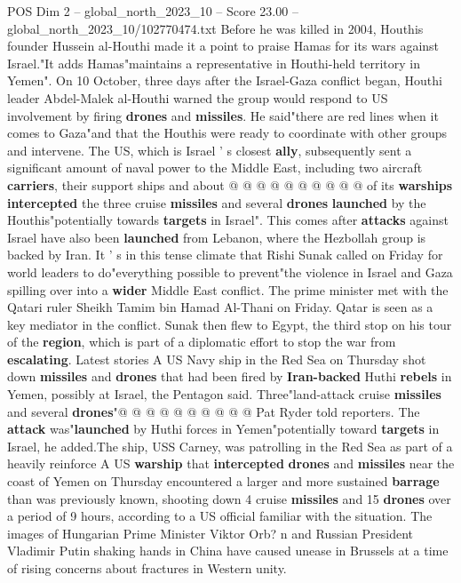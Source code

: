 \begin{textsample}{POS Dim 2 – global\_north\_2023\_10 – Score 23.00 – global\_north\_2023\_10/102770474.txt}
Before he was killed in 2004, Houthis founder Hussein al-Houthi made it a point to praise Hamas for its wars against Israel."It adds Hamas"maintains a representative in Houthi-held territory in Yemen".
On 10 October, three days after the Israel-Gaza conflict began, Houthi leader Abdel-Malek al-Houthi warned the group would respond to US involvement by firing \textbf{drones} and \textbf{missiles}.
He said"there are red lines when it comes to Gaza"and that the Houthis were ready to coordinate with other groups and intervene.
The US, which is Israel ' s closest \textbf{ally}, subsequently sent a significant amount of naval power to the Middle East, including two aircraft \textbf{carriers}, their support ships and about @ @ @ @ @ @ @ @ @ @ of its \textbf{warships} \textbf{intercepted} the three cruise \textbf{missiles} and several \textbf{drones} \textbf{launched} by the Houthis"potentially towards \textbf{targets} in Israel".
This comes after \textbf{attacks} against Israel have also been \textbf{launched} from Lebanon, where the Hezbollah group is backed by Iran.
It ' s in this tense climate that Rishi Sunak called on Friday for world leaders to do"everything possible to prevent"the violence in Israel and Gaza spilling over into a \textbf{wider} Middle East conflict.
The prime minister met with the Qatari ruler Sheikh Tamim bin Hamad Al-Thani on Friday.
Qatar is seen as a key mediator in the conflict.
Sunak then flew to Egypt, the third stop on his tour of the \textbf{region}, which is part of a diplomatic effort to stop the war from \textbf{escalating}.
Latest stories A US Navy ship in the Red Sea on Thursday shot down \textbf{missiles} and \textbf{drones} that had been fired by \textbf{Iran-backed} Huthi \textbf{rebels} in Yemen, possibly at Israel, the Pentagon said.
Three"land-attack cruise \textbf{missiles} and several \textbf{drones}"@ @ @ @ @ @ @ @ @ @ Pat Ryder told reporters.
The \textbf{attack} was"\textbf{launched} by Huthi forces in Yemen"potentially toward \textbf{targets} in Israel, he added.The ship, USS Carney, was patrolling in the Red Sea as part of a heavily reinforce A US \textbf{warship} that \textbf{intercepted} \textbf{drones} and \textbf{missiles} near the coast of Yemen on Thursday encountered a larger and more sustained \textbf{barrage} than was previously known, shooting down 4 cruise \textbf{missiles} and 15 \textbf{drones} over a period of 9 hours, according to a US official familiar with the situation.
The images of Hungarian Prime Minister Viktor Orb? n and Russian President Vladimir Putin shaking hands in China have caused unease in Brussels at a time of rising concerns about fractures in Western unity.

\end{textsample}
